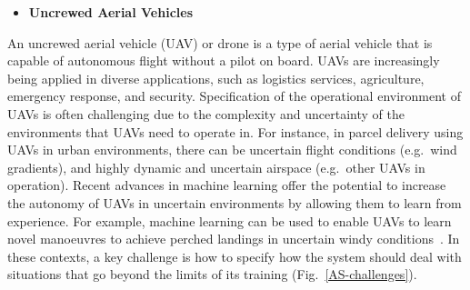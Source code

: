 \documentclass[sigconf,nonacm]{acmart}%
\begin{document}
	\begin{itemize}[leftmargin=0.5cm]
		\item \textbf{Uncrewed Aerial Vehicles}
	\end{itemize}
	An uncrewed aerial vehicle (UAV) or drone is a type of aerial vehicle that is capable of autonomous flight without a pilot on board. UAVs are increasingly being applied in diverse applications, such as logistics services, agriculture, emergency response, and security. Specification of the operational environment of UAVs is often challenging due to the complexity and uncertainty of the environments that UAVs need to operate in. 
	For instance, in parcel delivery using UAVs in urban environments, there can be uncertain flight conditions (e.g.\ wind gradients), and highly dynamic and uncertain airspace (e.g.\ other UAVs in operation). 
	Recent advances in machine learning offer the potential to increase the autonomy of UAVs in uncertain environments by allowing them to learn from experience. 
	For example, machine learning can be used to enable UAVs to learn novel manoeuvres to achieve perched landings in uncertain windy conditions~\cite{Fletcher2021}. 
	In these contexts, a key challenge is how to specify how the system should deal with situations that go beyond the limits of its training (Fig.~\ref{AS-challenges}).
	
\end{document}
